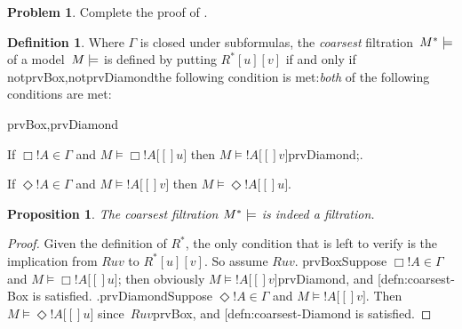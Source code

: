 \documentclass[10pt,a4paper]{article}
\makeatletter
\theoremstyle{plain}
\newtheorem{prop}[thm]{Proposition}
\theoremstyle{definition}
\newtheorem{defn}[thm]{Definition}
\newtheorem{prob}{Problem}[section]
\theoremstyle{remark}
\newenvironment{probtag}[1]{\begin{prob}}{\end{prob}}
\newcommand*{\ollabel}[1]{\label{#1}}
\newcommand{\olref}{\@ifnextchar[{\olref@i}{\olref@final}}
\def\olref@i[#1]{\@ifnextchar[{\olref@ii}{\olref@final}}
\def\olref@ii[#1]{\@ifnextchar[{\olref@iii}{\olref@final}}
\def\olref@iii[#1]{\olref@final}
\def\olref@final#1{\ref{#1}}
\providecommand{\mSat}[3]{\ensuremath{#1 \models #2[#3]}}
\providecommand{\mModel}[2]{\ensuremath{#1 \models #2}}
\providecommand{\iftag}[1]{#1}
\providecommand{\tagitem}[1]{\item[#1]}
\makeatother
\begin{document}
\begin{probtag}{probBox,probDiamond}
  Complete the proof of \olref[nml][fil][exf]{prop:finest}.
\end{probtag}

\begin{defn}
  Where $\Gamma$ is closed under subformulas, the \emph{coarsest}
  filtration~$\mModel{M^*}$ of a model~$\mModel{M}$ is defined by
  putting $R^*[u][v]$ if and only if
  \iftag{notprvBox,notprvDiamond}{the following condition is
    met:}{\emph{both} of the following conditions are met:}
  \begin{tagenumerate}{prvBox,prvDiamond}
  \tagitem{prvBox}{\ollabel{defn:coarsest-Box}If $\Box!A \in \Gamma$
    and $\mSat{M}{\Box!A}[u]$ then
    $\mSat{M}{!A}[v]$\iftag{prvDiamond}{;}{.}}{}
  \tagitem{prvDiamond}{\ollabel{defn:coarsest-Diamond}If $\Diamond!A
    \in \Gamma$ and $\mSat{M}{!A}[v]$ then
    $\mSat{M}{\Diamond!A}[u]$.}{}
  \end{tagenumerate}
\end{defn}

\begin{prop}
  The coarsest filtration $\mModel{M^*}$ is indeed a filtration. 
\end{prop}

\begin{proof}
  Given the definition of $R^*$, the only condition that is left to
  verify is the implication from $Ruv$ to $R^*[u][v]$. So assume
  $Ruv$. \iftag{prvBox}{Suppose $\Box!A \in \Gamma$ and
    $\mSat{M}{\Box!A}[u]$; then obviously
    $\mSat{M}{!A}[v]$\iftag{prvDiamond}{, and
      \olref{defn:coarsest-Box} is
      satisfied. }{.}}{}\iftag{prvDiamond}{Suppose $\Diamond!A \in
    \Gamma$ and $\mSat{M}{!A}[v]$. Then $\mSat{M}{\Diamond!A}[u]$
    since~$Ruv$\iftag{prvBox}{, and \olref{defn:coarsest-Diamond} is
      satisfied}{}.}{}
\end{proof}
\end{document}
